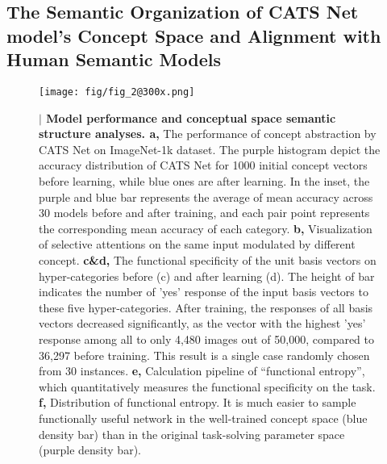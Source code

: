 \documentclass[pdflatex,sn-mathphys-num,lineno]{sn-jnl}%
\begin{document}
\begin{CJK}{UTF8}{gbsn}
\subsection{The Semantic Organization of CATS Net model’s Concept Space and Alignment with Human Semantic Models}\label{subsec_space_prop} 

\begin{figure}[htbp]
\centering
\texttt{[image: fig/fig\_2@300x.png]}
\caption{\textbf{$\vert$ Model performance and conceptual space semantic structure analyses. a,} The performance of concept abstraction by CATS Net on ImageNet-1k dataset. The purple histogram depict the accuracy distribution of CATS Net for 1000 initial concept vectors before learning, while blue ones are after learning.  In the inset,  the purple and blue bar represents the average of mean accuracy across 30 models before and after training, and each pair point represents the corresponding mean accuracy of each category. \textbf{b,} Visualization of selective attentions on the same input modulated by different concept. \textbf{c\&d,} The functional specificity of the unit basis vectors on hyper-categories before (c) and after learning (d). The height of bar indicates the number of 'yes' response of the input basis vectors to these five hyper-categories. After training, the responses of all basis vectors decreased significantly, as the vector with the highest 'yes' response among all to only 4,480 images out of 50,000, compared to 36,297 before training. This result is a single case randomly chosen from 30 instances. \textbf{e,} Calculation pipeline of “functional entropy”, which quantitatively measures the functional specificity on the task. \textbf{f,} Distribution of functional entropy. It is much easier to sample functionally useful network in the well-trained concept space (blue density bar) than in the original task-solving parameter space (purple density bar).}
\label{fig2}
\end{figure}


\end{CJK}
\end{document}
